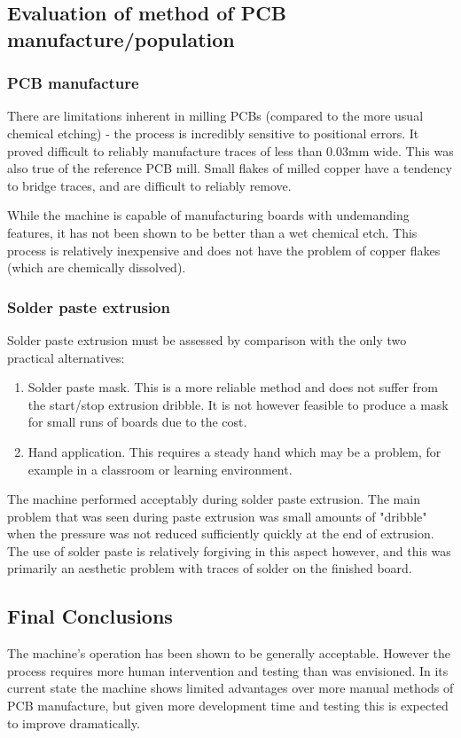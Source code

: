 \subsection{Evaluation of method of PCB manufacture/population}

\subsubsection{PCB manufacture}
There are limitations inherent in milling PCBs (compared to the more
usual chemical etching) - the process is incredibly sensitive to positional
errors. It proved difficult to reliably manufacture traces of less than 0.03mm
wide. This was also true of the reference PCB mill. Small flakes of milled
copper have a tendency to bridge traces, and are difficult to reliably remove.

While the machine is capable of manufacturing boards with undemanding
features, it has not been shown to be better than a wet chemical etch.
This process is relatively inexpensive and does not have the problem of 
copper flakes (which are chemically dissolved).

\subsubsection{Solder paste extrusion}
Solder paste extrusion must be assessed by comparison with the only two
practical alternatives:

\begin{enumerate}
\item
Solder paste mask. This is a more reliable method and does not suffer from
the start/stop extrusion dribble. It is not however feasible to produce
a mask for small runs of boards due to the cost. 

\item
Hand application. This requires a steady hand which may be a problem, for
example in a classroom or learning environment.
\end{enumerate}

The machine performed acceptably during solder paste extrusion. The 
main problem that was seen during paste extrusion was small amounts of "dribble"
when the pressure was not reduced sufficiently quickly at the end of extrusion.
The use of solder paste is relatively forgiving in this aspect however, and
this was primarily an aesthetic problem with traces of solder on the finished
board.

\subsection{Final Conclusions}
The machine's operation has been shown to be generally acceptable. However
the process requires more human intervention and testing than was envisioned.
In its current state the machine shows limited advantages over
more manual methods of PCB manufacture, but given more development time
and testing this is expected to improve dramatically.

